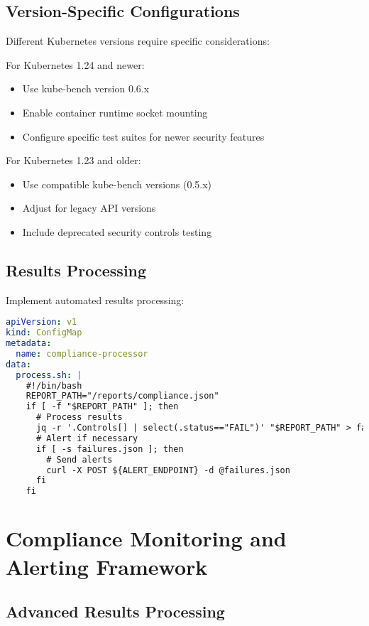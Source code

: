 \documentclass[PMO,lsstdraft,authoryear,toc]{lsstdoc}
\begin{document}
\subsection{Version-Specific Configurations}

Different Kubernetes versions require specific considerations:

For Kubernetes 1.24 and newer:
\begin{itemize}
    \item Use kube-bench version 0.6.x
    \item Enable container runtime socket mounting
    \item Configure specific test suites for newer security features
\end{itemize}

For Kubernetes 1.23 and older:
\begin{itemize}
    \item Use compatible kube-bench versions (0.5.x)
    \item Adjust for legacy API versions
    \item Include deprecated security controls testing
\end{itemize}

\subsection{Results Processing}

Implement automated results processing:

\begin{lstlisting}[language=yaml]
apiVersion: v1
kind: ConfigMap
metadata:
  name: compliance-processor
data:
  process.sh: |
    #!/bin/bash
    REPORT_PATH="/reports/compliance.json"
    if [ -f "$REPORT_PATH" ]; then
      # Process results
      jq -r '.Controls[] | select(.status=="FAIL")' "$REPORT_PATH" > failures.json
      # Alert if necessary
      if [ -s failures.json ]; then
        # Send alerts
        curl -X POST ${ALERT_ENDPOINT} -d @failures.json
      fi
    fi
\end{lstlisting}

\section{Compliance Monitoring and Alerting Framework}

\subsection{Advanced Results Processing}
\end{document}

